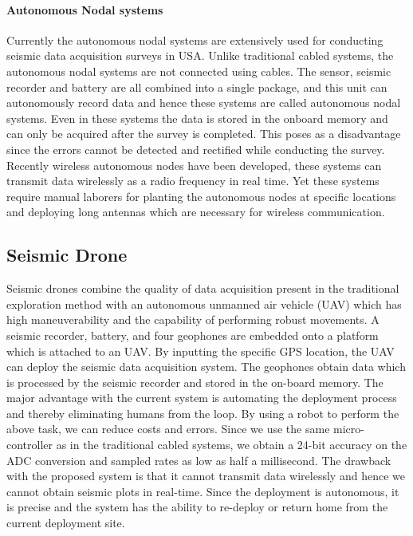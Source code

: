 \documentclass[conference]{IEEEtran}
\newcommand{\todo}[1]{\vspace{5 mm}\par \noindent \framebox{\begin{minipage}[c]{0.98 \columnwidth} \ttfamily\flushleft \textcolor{red}{#1}\end{minipage}}\vspace{5 mm}\par}
\begin{document}
 \paragraph{Autonomous Nodal systems}
 
 Currently the autonomous nodal systems are extensively used for conducting seismic data acquisition surveys in USA. Unlike traditional cabled systems, the autonomous nodal systems are not connected using cables. The sensor, seismic recorder and battery are all combined into a single package, and this unit can autonomously record data and hence these systems are called autonomous nodal systems. Even in these systems the data is stored in the onboard memory and can only be acquired after the survey is completed. This poses as a disadvantage since the errors cannot be detected and rectified while conducting the survey. Recently wireless autonomous nodes have been developed, these systems can transmit data wirelessly as a radio frequency in real time. Yet these systems require manual laborers for planting the autonomous nodes at specific locations and deploying long antennas which are necessary for wireless communication.
 
\subsection{Seismic Drone}  \todo{mention the patent here}

Seismic drones combine the quality of data acquisition present in the traditional exploration method with an autonomous unmanned air vehicle (UAV) which has high maneuverability and the capability of performing robust movements. A seismic recorder, battery, and four geophones are embedded onto a platform which is attached to an UAV. By inputting the specific GPS location, the UAV can deploy the seismic data acquisition system. The geophones obtain data which is processed by the seismic recorder and stored in the on-board memory. The major advantage with the current system is automating the deployment process and thereby eliminating humans from the loop. By using a robot to perform the above task, we can reduce costs and errors. Since we use the same micro-controller as in the traditional cabled systems, we obtain a 24-bit accuracy on the ADC conversion and sampled rates as low as half a millisecond. The drawback with the proposed system is that it cannot transmit data wirelessly and hence we cannot obtain seismic plots in real-time. Since the deployment is autonomous, it is precise and the system has the ability to re-deploy or return home from the current deployment site. 
 
\end{document}
